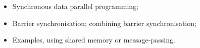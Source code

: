 
\begin{slide}

\begin{itemize}
\item 
Synchronous data parallel programming;

\item
Barrier synchronisation; combining barrier synchronisation;

\item
Examples, using shared memory or message-passing.
\end{itemize}
\end{slide}


\exercises








